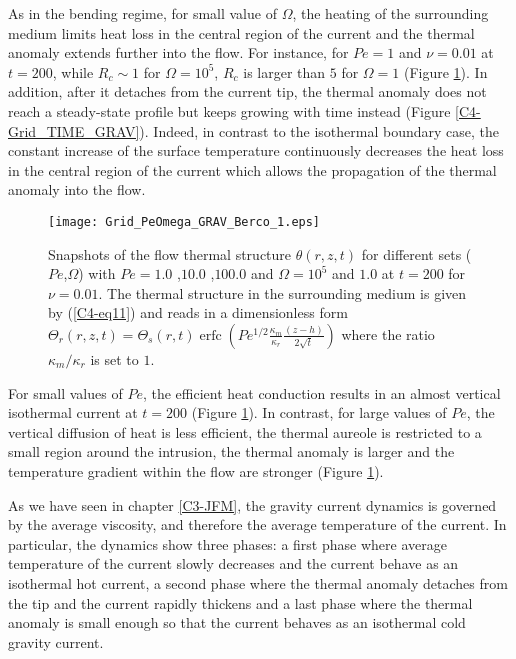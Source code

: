 As in the bending regime, for  small value of $\Omega$, the heating of
the surrounding medium  limits heat loss in the central  region of the
current and  the thermal  anomaly extends further  into the  flow. For
instance, for $Pe=1$ and $\nu=0.01$  at $t=200$, while $R_c\sim 1$ for
$\Omega=10^5$,  $R_c$ is  larger than  $5$  for $\Omega  =1 $  (Figure
\ref{C4-Grid_PeOmega_Heating_GRAV}).  In  addition, after  it detaches
from  the  current   tip,  the  thermal  anomaly  does   not  reach  a
steady-state  profile  but keeps  growing  with  time instead  (Figure
\ref{C4-Grid_TIME_GRAV}).   Indeed,  in  contrast  to  the  isothermal
boundary  case,  the  constant  increase of  the  surface  temperature
continuously  decreases the  heat loss  in the  central region  of the
current which allows  the propagation of the thermal  anomaly into the
flow.
\begin{figure}[htpb]
  \begin{center}
    \graphicspath{ {/Users/thorey/Documents/These/Projet/Refroidissement/Skin_Model/Figure/Figure_Heating/} }
    \texttt{[image: Grid\_PeOmega\_GRAV\_Berco\_1.eps]}
    \caption{Snapshots of  the flow thermal  structure $\theta(r,z,t)$
      for  different  sets  ($Pe$,$\Omega$)  with  $Pe=  1.0$  ,$10.0$
      ,$100.0$   and   $\Omega=10^5$   and  $1.0$   at   $t=200$   for
      $\nu=0.01$. The  thermal structure in the  surrounding medium is
      given  by  (\ref{C4-eq11}) and  reads  in  a dimensionless  form
      $\Theta_r(r,z,t)=\Theta_s(r,t)\operatorname{erfc}{\left(Pe^{1/2}\frac{\kappa_m}{\kappa_r}\frac{(z-h)}{2\sqrt{t}}\right)}$
      where the ratio $\kappa_m/\kappa_r$ is set to $1$.}
    \label{C4-Grid_PeOmega_Heating_GRAV}
  \end{center}
\end{figure}


For small values of $Pe$, the  efficient heat conduction results in an
almost    vertical    isothermal    current   at    $t=200$    (Figure
\ref{C4-Grid_PeOmega_Heating_GRAV}). In contrast,  for large values of
$Pe$, the  vertical diffusion of  heat is less efficient,  the thermal
aureole  is restricted  to a  small region  around the  intrusion, the
thermal anomaly is larger and the temperature gradient within the flow
are stronger (Figure \ref{C4-Grid_PeOmega_Heating_GRAV}).

As we have seen in  chapter \ref{C3-JFM}, the gravity current dynamics
is  governed  by the  average  viscosity,  and therefore  the  average
temperature of  the current.  In  particular, the dynamics  show three
phases: a first phase where  average temperature of the current slowly
decreases  and the  current behave  as  an isothermal  hot current,  a
second phase where  the thermal anomaly detaches from the  tip and the
current rapidly thickens and a last phase where the thermal anomaly is
small enough so that the current behaves as an isothermal cold gravity
current.

